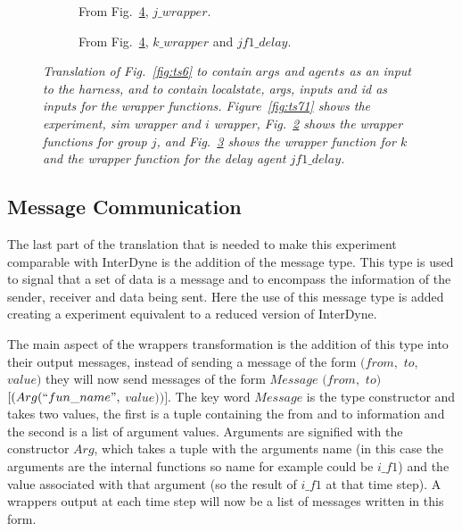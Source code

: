 \documentclass{article}
\begin{document}
\begin{figure}[H]\ContinuedFloat
	\centering
	\begin{subfigure}[b]{1\textwidth}
	
	\caption{From Fig.~\ref{fig:ts7}, $j\_wrapper$.  }
        \label{fig:ts72}
	\end{subfigure}
	\caption*{}
\end{figure}
	
\begin{figure}[H]\ContinuedFloat
	\centering
	\begin{subfigure}[b]{1\textwidth}
	
	\caption{From Fig.~\ref{fig:ts7}, $k\_wrapper$ and $jf1\_delay$.  }
        \label{fig:ts73}
	\end{subfigure}
	\caption{\it Translation of Fig.~\ref{fig:ts6} to contain $args$ and $agents$ as an input to the harness, and to contain localstate, args, inputs and id as inputs for the wrapper functions. Figure~\ref{fig:ts71} shows the experiment, sim wrapper and $i$ wrapper, Fig.~\ref{fig:ts72} shows the wrapper functions for group $j$, and Fig.~\ref{fig:ts73} shows the wrapper function for $k$ and the wrapper function for the delay agent $jf1\_delay$.}
	\label{fig:ts7}
\end{figure} 



\subsection{Message Communication}
The last part of the translation that is needed to make this experiment comparable with InterDyne is the addition of the message type. This type is used to signal that a set of data is a message and to encompass  the information of the sender, receiver and data being sent. Here the use of this message type is added creating a experiment equivalent to a reduced version of InterDyne.   

The main aspect of the wrappers transformation is the addition of this type into their output messages, instead of sending a message of the form $(from,$ $to,$ $value)$ they will now send messages of the form  $Message$ $(from,$ $to)$ $[(Arg(``fun\_name",$ $value))]$. The key word $Message$ is the type constructor and takes two values, the first is a tuple containing the from and to information and the second is a list of argument values. Arguments are signified with the constructor $Arg$, which takes a tuple with the arguments name (in this case the arguments are the internal functions so  name for example could be $i\_f1$)  and the value associated with that argument (so the result of $i\_f1$ at that time step). A wrappers output at each time step will now be a list of messages written in this form. 
\end{document}
